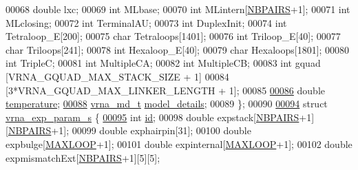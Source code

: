 \begin{DoxyCode}
00068   \textcolor{keywordtype}{double}  lxc;
00069   \textcolor{keywordtype}{int}     MLbase;
00070   \textcolor{keywordtype}{int}     MLintern[\hyperlink{energy__const_8h_a5e75221c779d618eab81e096f37e32ce}{NBPAIRS}+1];
00071   \textcolor{keywordtype}{int}     MLclosing;
00072   \textcolor{keywordtype}{int}     TerminalAU;
00073   \textcolor{keywordtype}{int}     DuplexInit;
00074   \textcolor{keywordtype}{int}     Tetraloop\_E[200];
00075   \textcolor{keywordtype}{char}    Tetraloops[1401];
00076   \textcolor{keywordtype}{int}     Triloop\_E[40];
00077   \textcolor{keywordtype}{char}    Triloops[241];
00078   \textcolor{keywordtype}{int}     Hexaloop\_E[40];
00079   \textcolor{keywordtype}{char}    Hexaloops[1801];
00080   \textcolor{keywordtype}{int}     TripleC;
00081   \textcolor{keywordtype}{int}     MultipleCA;
00082   \textcolor{keywordtype}{int}     MultipleCB;
00083   \textcolor{keywordtype}{int}     gquad [VRNA\_GQUAD\_MAX\_STACK\_SIZE + 1]
00084                 [3*VRNA\_GQUAD\_MAX\_LINKER\_LENGTH + 1];
00085 
\hypertarget{params_8h_source_l00086}{}\hyperlink{group__energy__parameters_aeed2cd83713012bcb52e431041e037c8}{00086}   \textcolor{keywordtype}{double}  \hyperlink{group__energy__parameters_aeed2cd83713012bcb52e431041e037c8}{temperature};            
\hypertarget{params_8h_source_l00088}{}\hyperlink{group__energy__parameters_a7b84353eb9075c595bad4ceb871bcae7}{00088}   \hyperlink{group__model__details_structvrna__md__s}{vrna\_md\_t} \hyperlink{group__energy__parameters_a7b84353eb9075c595bad4ceb871bcae7}{model\_details};   
00089 \};
00090 
\hypertarget{params_8h_source_l00094}{}\hyperlink{group__energy__parameters}{00094} \textcolor{keyword}{struct }\hyperlink{group__energy__parameters_structvrna__exp__param__s}{vrna\_exp\_param\_s} \{
\hypertarget{params_8h_source_l00095}{}\hyperlink{group__energy__parameters_a378d5bcf2bae1f3ec84c912c7d3908d2}{00095}   \textcolor{keywordtype}{int}     \hyperlink{group__energy__parameters_a378d5bcf2bae1f3ec84c912c7d3908d2}{id};   
00098   \textcolor{keywordtype}{double}  expstack[\hyperlink{energy__const_8h_a5e75221c779d618eab81e096f37e32ce}{NBPAIRS}+1][\hyperlink{energy__const_8h_a5e75221c779d618eab81e096f37e32ce}{NBPAIRS}+1];
00099   \textcolor{keywordtype}{double}  exphairpin[31];
00100   \textcolor{keywordtype}{double}  expbulge[\hyperlink{energy__const_8h_ad1bd6eabac419670ddd3c9ed82145988}{MAXLOOP}+1];
00101   \textcolor{keywordtype}{double}  expinternal[\hyperlink{energy__const_8h_ad1bd6eabac419670ddd3c9ed82145988}{MAXLOOP}+1];
00102   \textcolor{keywordtype}{double}  expmismatchExt[\hyperlink{energy__const_8h_a5e75221c779d618eab81e096f37e32ce}{NBPAIRS}+1][5][5];

\end{DoxyCode}
